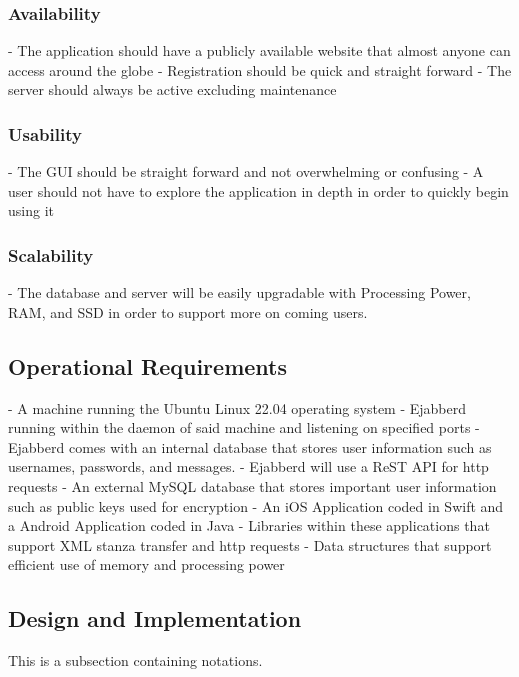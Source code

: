 \documentclass[11pt]{article}
\theoremstyle{plain}
\theoremstyle{definition}
\begin{document}
\subsubsection{Availability}
- The application should have a publicly available website that almost anyone can access 
  around the globe
- Registration should be quick and straight forward
- The server should always be active excluding maintenance
\subsubsection{Usability}
- The GUI should be straight forward and not overwhelming or confusing
- A user should not have to explore the application in depth in order to quickly begin using it
\subsubsection{Scalability}
- The database and server will be easily upgradable with Processing Power, RAM, and SSD in order to support more on coming users. 

\subsection{Operational Requirements}\label{sec:operationalrequirements}
- A machine running the Ubuntu Linux 22.04 operating system
- Ejabberd running within the daemon of said machine and listening on specified ports
- Ejabberd comes with an internal database that stores user information such as usernames, passwords, and messages.
- Ejabberd will use a ReST API for http requests
- An external MySQL database that stores important user information such as public keys 
  used for encryption
- An iOS Application coded in Swift and a Android Application coded in Java
- Libraries within these applications that support XML stanza transfer and http requests
- Data structures that support efficient use of memory and processing power

\subsection{Design and Implementation}\label{sec:designandimplementationrequirements}
This is a subsection containing notations.
\end{document}
